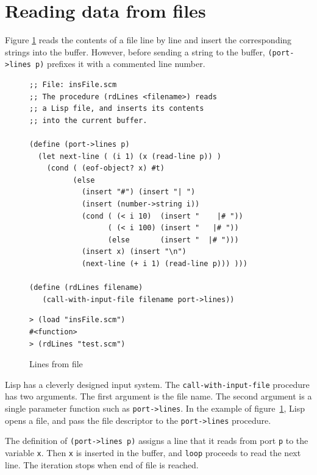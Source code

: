 \documentclass[a4paper,12pt]{book}
\newenvironment{fmpage}[1]
               {\begin{lrbox}{\fmbox}\begin{minipage}{#1}}
               {\end{minipage}\end{lrbox}\fbox{\usebox{\fmbox}}}
\begin{document}
\section{Reading data from files}

Figure \ref{rdFile} reads the contents
of a file line by line and insert
 the corresponding
strings into the buffer. However, before
sending a string to the buffer,
\verb|(port->lines p)| prefixes it
with a commented line number.

\begin{figure}[!h]
\begin{fmpage}{\linewidth}
\begin{verbatim}
;; File: insFile.scm
;; The procedure (rdLines <filename>) reads
;; a Lisp file, and inserts its contents
;; into the current buffer.

(define (port->lines p)
  (let next-line ( (i 1) (x (read-line p)) )
    (cond ( (eof-object? x) #t)
          (else 
            (insert "#") (insert "| ")
            (insert (number->string i))
            (cond ( (< i 10)  (insert "    |# "))
                  ( (< i 100) (insert "   |# "))
                  (else       (insert "  |# ")))
            (insert x) (insert "\n")
            (next-line (+ i 1) (read-line p))) )))

(define (rdLines filename)
   (call-with-input-file filename port->lines))
\end{verbatim}
\end{fmpage}

\begin{fmpage}{\linewidth}
\begin{verbatim}
> (load "insFile.scm")
#<function>
> (rdLines "test.scm")
\end{verbatim}
\end{fmpage}
\caption{Lines from file}
\label{rdFile}
\end{figure}

Lisp has a cleverly designed input system.
The  
\verb|call-with-input-file| \label{page:call-with-input-file}
procedure has two arguments. The first
 argument is the file name. 
The second argument is
a single parameter function such
as \verb|port->lines|. In the example
of figure~\ref{rdFile}, Lisp 
opens a file, and pass the file descriptor
to the \verb|port->lines| procedure.

The definition of \verb|(port->lines p)|
assigns a line that it reads 
from port \verb|p|
to the variable \verb|x|. Then \verb|x|
is inserted in the buffer, and \verb|loop|
proceeds to read the next line.
The iteration stops when 
end of file is reached.
\end{document}

